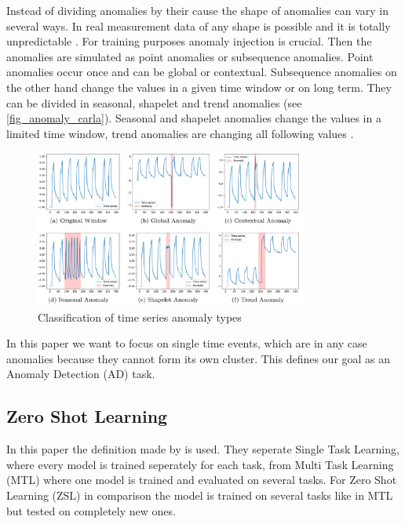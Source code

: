 Instead of dividing anomalies by their cause the shape of anomalies can vary in several ways. In real measurement data of any shape is possible and it is totally unpredictable \cite{schwartz_maeday_2024}. For training purposes anomaly injection is crucial. Then the anomalies are simulated as point anomalies or subsequence anomalies. Point anomalies occur once and can be global or contextual. Subsequence anomalies on the other hand change the values in a given time window or on long term. They can be divided in seasonal, shapelet and trend anomalies (see \autoref{fig_anomaly_carla}). Seasonal and shapelet anomalies change the values in a limited time window, trend anomalies are changing all following values \cite[p. 9]{darban_carla_2024}. %
\begin{figure}[h!] %
  \centering
  \includegraphics[width=0.8\textwidth]{images/carla_anomalies.png}
  \caption{Classification of time series anomaly types \cite{darban_carla_2024}}
  \label{fig_anomaly_carla}
\end{figure}

In this paper we want to focus on single time events, which are in any case anomalies because they cannot form its own cluster. This defines our goal as an Anomaly Detection (AD) task.
\subsection{Zero Shot Learning}
In this paper the definition made by \cite{nivarthi_unified_2022} is used. They seperate Single Task Learning, where every model is trained seperately for each task, from Multi Task Learning (MTL) where one model is trained and evaluated on several tasks. For Zero Shot Learning (ZSL) in comparison the model is trained on several tasks like in MTL but tested on completely new ones.

